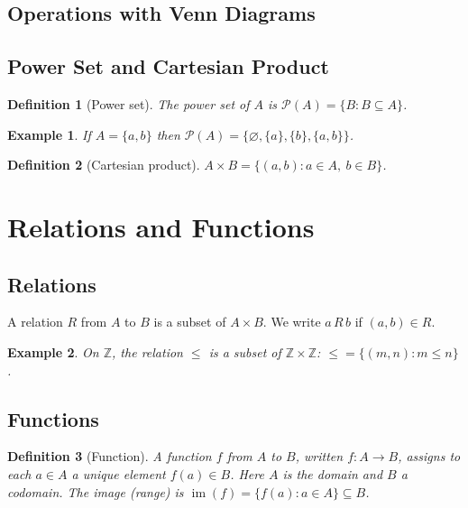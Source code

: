 \documentclass[11pt]{article}
\newtheorem{definition}{Definition}
\newtheorem{example}{Example}
\newcommand{\Z}{\mathbb{Z}}
\newcommand{\powerset}{\mathcal{P}}
\newcommand{\im}{\operatorname{im}}
\begin{document}
\subsection{Operations with Venn Diagrams}
\begin{center}
\end{center}

\subsection{Power Set and Cartesian Product}
\begin{definition}[Power set]
The \emph{power set} of $A$ is $\powerset(A)=\{B: B\subseteq A\}$.
\end{definition}
\begin{example}
If $A=\{a,b\}$ then $\powerset(A)=\{\varnothing,\{a\},\{b\},\{a,b\}\}$.
\end{example}
\begin{definition}[Cartesian product]
$A\times B=\{(a,b): a\in A,\ b\in B\}$.
\end{definition}

\section{Relations and Functions}
\subsection{Relations}
A relation $R$ from $A$ to $B$ is a subset of $A\times B$. We write $a\,R\,b$ if $(a,b)\in R$.

\begin{example}
On $\Z$, the relation $\le$ is a subset of $\Z\times\Z$: $\le =\{(m,n): m\le n\}$.
\end{example}

\subsection{Functions}
\begin{definition}[Function]
A function $f$ from $A$ to $B$, written $f\colon A\to B$, assigns to each $a\in A$ a unique element $f(a)\in B$. Here $A$ is the \emph{domain} and $B$ a \emph{codomain}. The \emph{image} (range) is $\im(f)=\{f(a): a\in A\}\subseteq B$.
\end{definition}
\end{document}
